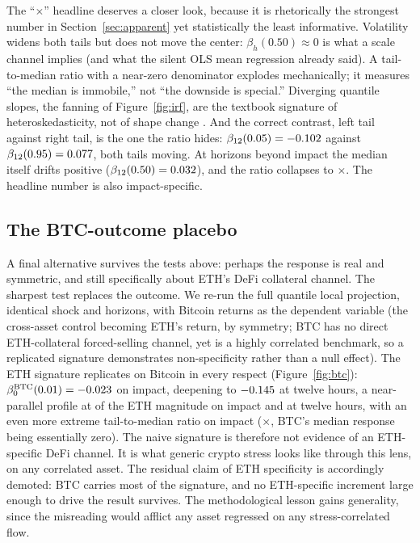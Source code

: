 The ``\RatioTailMedImpact$\times$'' headline deserves a closer look,
because it is rhetorically the strongest number in
Section~\ref{sec:apparent} yet statistically the least informative. Volatility
widens both tails but does not move the center: $\beta_h(0.50) \approx 0$
is what a scale channel implies (and what the silent OLS mean
regression already said). A tail-to-median ratio with a near-zero
denominator explodes mechanically; it measures ``the median is immobile,''
not ``the downside is special.'' Diverging quantile slopes, the fanning
of Figure~\ref{fig:irf}, are the textbook signature of
heteroskedasticity, not of shape change \citep{koenker1982,machado2000}.
And the correct contrast, left tail against right tail, is the one
the ratio hides: $\beta_{12}(0.05) = -0.102$ against
$\beta_{12}(0.95) = 0.077$, both tails moving. At
horizons beyond impact the median itself drifts positive
($\beta_{12}(0.50) = 0.032$), and the ratio collapses to
\RatioTailMedHtwelve$\times$. The headline number is also
impact-specific.

\subsection{The BTC-outcome placebo}
\label{sec:btc}

A final alternative survives the tests above: perhaps the response is
real and symmetric, and still specifically about ETH's DeFi collateral
channel. The sharpest test replaces the outcome. We re-run the full
quantile local projection, identical shock and horizons, with
Bitcoin returns as the dependent variable (the cross-asset control
becoming ETH's return, by symmetry; BTC has no direct ETH-collateral
forced-selling channel, yet is a highly correlated benchmark, so a
replicated signature demonstrates non-specificity rather than a null
effect). The ETH signature replicates on Bitcoin in every respect
(Figure~\ref{fig:btc}): $\beta^{\text{BTC}}_0(0.01) = -0.023$
on impact, deepening to $-0.145$ at twelve hours, a
near-parallel profile at \BtcOverEthHzero{} of the ETH magnitude on impact
and \BtcOverEthHtwelve{} at twelve hours, with an even more extreme
tail-to-median ratio on impact (\BtcRatioTailMedImpact$\times$, BTC's
median response being essentially zero). The naive signature is therefore
not evidence of an ETH-specific DeFi channel. It is what generic crypto
stress looks like through this lens, on any correlated asset. The residual
claim of ETH specificity is accordingly demoted: BTC carries most of the
signature, and no ETH-specific increment large enough to drive the result
survives. The methodological lesson gains generality, since the
misreading would afflict any asset regressed on any stress-correlated
flow.

